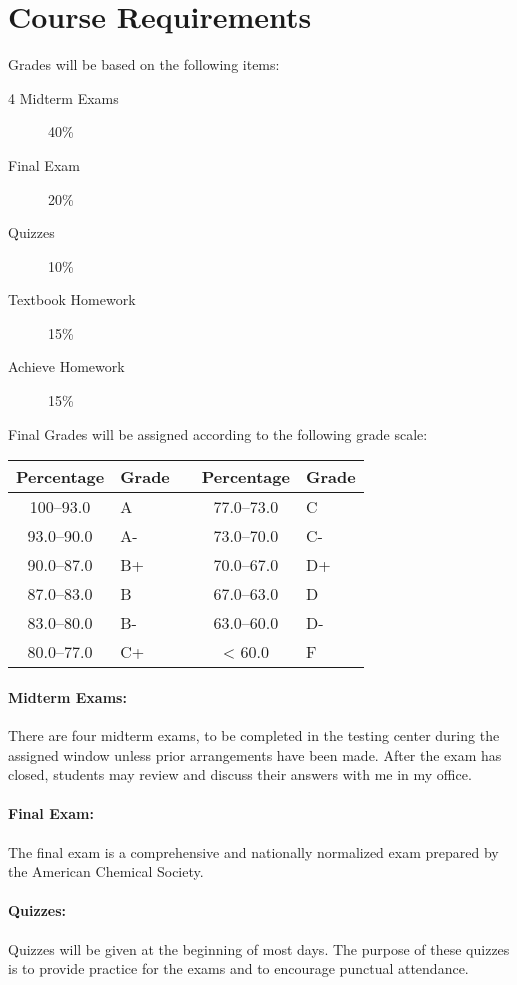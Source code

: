 \documentclass[12pt, letterpaper]{article}
\begin{document}
\section*{Course Requirements}
Grades will be based on the following items:
\begin{description}
	\item[4 Midterm Exams] 40\%
	\item[Final Exam] 20\%
	\item[Quizzes] 10\%
	\item[Textbook Homework] 15\%
	\item[Achieve Homework] 15\%
\end{description}
Final Grades will be assigned according to the following grade scale:

\begin{tabular}{cl|c|cl}
	Percentage & Grade &  & Percentage & Grade \\ \midrule
	100--93.0  & A     &  & 77.0--73.0 & C     \\
	93.0--90.0 & A-    &  & 73.0--70.0 & C-    \\
	90.0--87.0 & B+    &  & 70.0--67.0 & D+    \\
	87.0--83.0 & B     &  & 67.0--63.0 & D     \\
	83.0--80.0 & B-    &  & 63.0--60.0 & D-    \\
	80.0--77.0 & C+    &  & < 60.0     & F
\end{tabular}
\paragraph{Midterm Exams:}
There are four midterm exams, to be completed in the testing center during the assigned window unless prior arrangements have been made. After the exam has closed, students may review and discuss their answers with me in my office.

\paragraph{Final Exam:}
The final exam is a comprehensive and nationally normalized exam prepared by the American Chemical Society.

\paragraph{Quizzes:}
Quizzes will be given at the beginning of most days. The purpose of these quizzes is to provide practice for the exams and to encourage punctual attendance.
\end{document}
